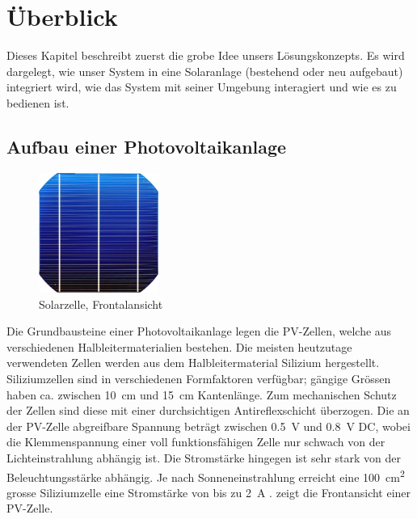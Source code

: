 \chapter{\"Uberblick}
\label{chap:uberblick}
Dieses Kapitel  beschreibt zuerst die grobe  Idee unsers L\"osungskonzepts. Es
wird  dargelegt, wie  unser System  in  eine Solaranlage  (bestehend oder  neu
aufgebaut) integriert wird, wie das System mit seiner Umgebung interagiert und
wie es zu bedienen ist.


\section{Aufbau einer Photovoltaikanlage}
\label{sec:solaranlage:aufbau}

\begin{figure}
    \centering
    \includegraphics[width=0.35\textwidth]{images/solar-facility/cell--400px.png}
    \caption{Solarzelle, Frontalansicht \cite{ref:pvcell:wikipedia}}
    \label{fig:pvcell:front}
\end{figure}

Die   Grundbausteine    einer   Photovoltaikanlage   legen    die   PV-Zellen,
welche   aus   verschiedenen   Halbleitermaterialien   bestehen. Die   meisten
heutzutage  verwendeten  Zellen  werden aus  dem  Halbleitermaterial  Silizium
hergestellt. Siliziumzellen  sind in  verschiedenen Formfaktoren  verf\"ugbar;
g\"angige   Gr\"ossen    haben   ca.   zwischen    \SI{10}{\centi\meter}   und
\SI{15}{\centi\meter}  Kantenl\"ange.   Zum  mechanischen  Schutz  der  Zellen
sind  diese mit  einer durchsichtigen  Antireflexschicht \"uberzogen.   Die an
der  PV-Zelle  abgreifbare  Spannung betr\"agt  zwischen  \SI{0.5}{\volt}  und
\SI{0.8}{\volt} DC,  wobei die  Klemmenspannung einer  voll funktionsf\"ahigen
Zelle nur schwach von  der Lichteinstrahlung abh\"angig ist. Die Stromst\"arke
hingegen   ist  sehr   stark  von   der  Beleuchtungsst\"arke   abh\"angig. Je
nach    Sonneneinstrahlung   erreicht    eine   \SI{100}{\centi\meter\squared}
grosse   Siliziumzelle  eine   Stromst\"arke   von   bis  zu   \SI{2}{\ampere}
\cite{ref:pv:gesellschaftFuerSonnenenergie}.  zeigt die
Frontansicht einer PV-Zelle.

